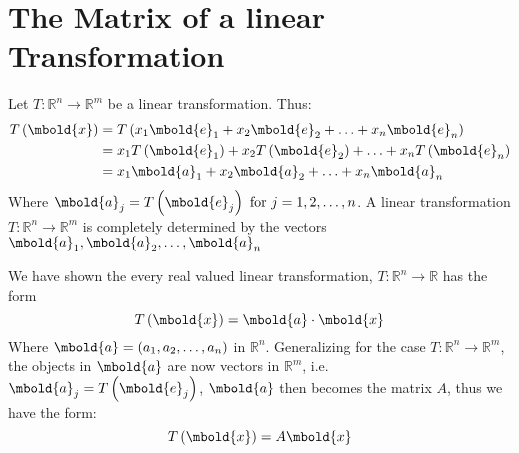 \documentclass[12pt letter]{report}
\begin{document}
\section{The Matrix of a linear Transformation}

Let $T : \mathbb{R}^{n} \to \mathbb{R}^{m}$ be a linear transformation. Thus:
\begin{align*}
  T \left( \mbold{x} \right) & = T \left( x_1\mbold{e}_1 + x_2\mbold{e}_2 + \ldots + x_n\mbold{e}_n \right)                                      \\
                             & = x_1 T \left( \mbold{e}_1 \right) + x_2 T \left( \mbold{e}_2 \right) + \ldots + x_n T \left( \mbold{e}_n \right) \\
                             & = x_1 \mbold{a}_1 + x_2 \mbold{a}_2 + \ldots + x_n \mbold{a}_n                                                    \\
\end{align*}
Where $\mbold{a}_j = T \left( \mbold{e}_j \right) \text{ for } j = 1,2,\ldots,n $. A linear transformation $T :
  \mathbb{R}^{n} \to  \mathbb{R}^{m}$ is completely determined by the vectors $\mbold{a}_1, \mbold{a}_2, \ldots,
  \mbold{a}_n$

We have shown the every real valued linear transformation, $T : \mathbb{R}^{n} \to  \mathbb{R}$ has the form
\[
  T \left( \mbold{x} \right)  = \mbold{a} \cdot  \mbold{x}
\]
Where $\mbold{a} = \left( a_1, a_2, \ldots, a_n \right) $ in $\mathbb{R}^{n}$. Generalizing for the case $T :
  \mathbb{R}^{n} \to \mathbb{R}^{m}$, the objects in $\mbold{a}$ are now vectors in $\mathbb{R}^{m}$, i.e. $\mbold{a}_j
  = T \left( \mbold{e}_j \right) $, $\mbold{a}$ then becomes the matrix $A$, thus we have the form:
\[
  T \left( \mbold{x} \right)  = A \mbold{x}
\]

\end{document}
